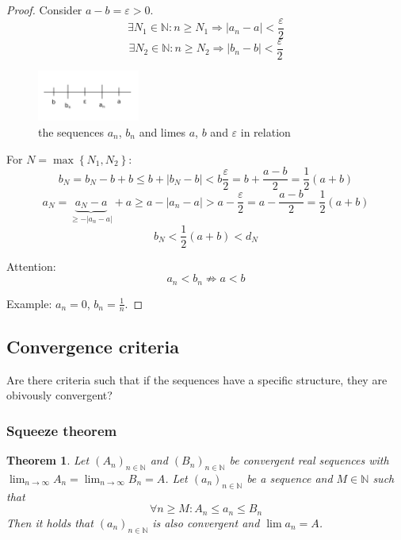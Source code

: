 \documentclass[a4paper,landscape,twocolumn]{article}
\newtheorem{theorem}{Theorem}
\newcommand\set[1]{\left\{#1\right\}}
\newcommand\abs[1]{\left|#1\right|}
\newcommand\seq[1]{{\left(#1\right)}_{n \in \mathbb N}}
\begin{document}
\begin{proof}
  Consider $a - b = \varepsilon > 0$.
  \[ \exists N_1 \in \mathbb N: n \geq N_1 \Rightarrow \abs{a_n - a} < \frac{\varepsilon}{2} \]
  \[ \exists N_2 \in \mathbb N: n \geq N_2 \Rightarrow \abs{b_n - b} < \frac{\varepsilon}{2} \]

  \begin{figure}[!h]
    \begin{center}
      \includegraphics[width=0.3\textwidth]{img/limes.pdf}
      \caption{the sequences $a_n$, $b_n$ and limes $a$, $b$ and $\varepsilon$ in relation}
    \end{center}
  \end{figure}

  For $N = \max\set{N_1, N_2}$:
  \[
      b_N
      = b_N - b + b \leq b + \abs{b_N - b} < b \frac{\varepsilon}{2}
      = b + \frac{a - b}{2}
      = \frac12 (a + b)
  \] \[
      a_N
      = \underbrace{a_N - a}_{\geq -\abs{a_n - a}} + a \geq a - \abs{a_n - a} > a - \frac{\varepsilon}{2}
      = a - \frac{a - b}{2}
      = \frac12 (a + b)
  \] \[
      b_N < \frac12 (a + b) < d_N
  \]

  Attention:
  \[ a_n < b_n \not\Rightarrow a < b \]

  Example: $a_n = 0$, $b_n = \frac1n$.
\end{proof}

\subsection{Convergence criteria}
%
Are there criteria such that if the sequences have a specific structure,
they are obivously convergent?

\subsubsection{Squeeze theorem}
\begin{theorem}
  Let $\seq{A_n}$ and $\seq{B_n}$ be convergent real sequences with $\lim_{n \to \infty} A_n = \lim_{n \to \infty} B_n = A$.
  Let $\seq{a_n}$ be a sequence and $M \in \mathbb N$ such that
  \[ \forall n \geq M: A_n \leq a_n \leq B_n \]
  Then it holds that $\seq{a_n}$ is also convergent and $\lim{a_n} = A$.
\end{theorem}
\end{document}
